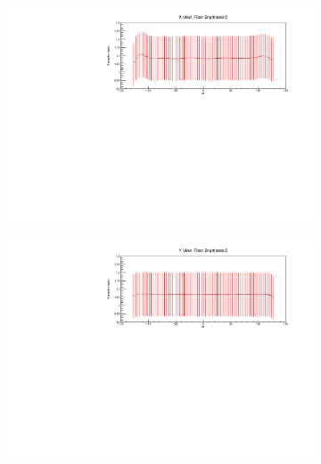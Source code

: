 \documentclass[12pt,a4paper]{article}
\begin{document}
\begin{figure}[hbtp]
\centering
\begin{subfigure}[t]{0.9\textwidth}
\centering
\includegraphics[width=\textwidth]{Plots/ThresholdCorrectionExample_axview_fb0_P4DataBasedSim.pdf}
\end{subfigure}
\begin{subfigure}[b]{0.9\textwidth}
\centering
\includegraphics[width=\textwidth]{Plots/ThresholdCorrectionExample_ayview_fb5_P4DataBasedSim.pdf}
\end{subfigure}
\begin{subfigure}[t]{0.9\textwidth}
\centering

\end{subfigure}
\end{figure}
\end{document}

